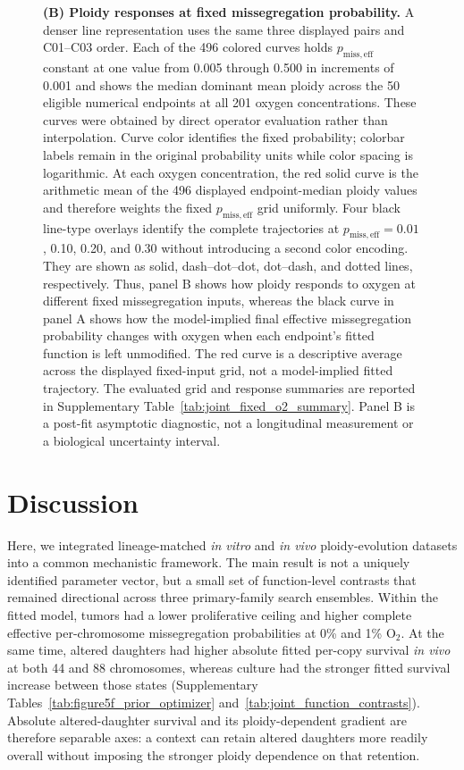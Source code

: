 \documentclass[11pt]{article}
\begin{document}
\begin{figure}[!htbp]
{\textbf{(B) Ploidy responses at fixed missegregation probability.} A denser line representation uses the same three displayed pairs and C01--C03 order. Each of the 496 colored curves holds \(p_{\mathrm{miss,eff}}\) constant at one value from 0.005 through 0.500 in increments of 0.001 and shows the median dominant mean ploidy across the 50 eligible numerical endpoints at all 201 oxygen concentrations. These curves were obtained by direct operator evaluation rather than interpolation. Curve color identifies the fixed probability; colorbar labels remain in the original probability units while color spacing is logarithmic. At each oxygen concentration, the red solid curve is the arithmetic mean of the 496 displayed endpoint-median ploidy values and therefore weights the fixed \(p_{\mathrm{miss,eff}}\) grid uniformly. Four black line-type overlays identify the complete trajectories at \(p_{\mathrm{miss,eff}}=0.01\), 0.10, 0.20, and 0.30 without introducing a second color encoding. They are shown as solid, dash--dot--dot, dot--dash, and dotted lines, respectively. Thus, panel B shows how ploidy responds to oxygen at different fixed missegregation inputs, whereas the black curve in panel A shows how the model-implied final effective missegregation probability changes with oxygen when each endpoint's fitted function is left unmodified. The red curve is a descriptive average across the displayed fixed-input grid, not a model-implied fitted trajectory. The evaluated grid and response summaries are reported in Supplementary Table~\ref{tab:joint_fixed_o2_summary}. Panel B is a post-fit asymptotic diagnostic, not a longitudinal measurement or a biological uncertainty interval.}
\label{fig:iteration1-o2-linked-model-selection}
\end{figure}


\clearpage
\section*{Discussion}

Here, we integrated lineage-matched \textit{in vitro} and \textit{in vivo} ploidy-evolution datasets into a common mechanistic framework. The main result is not a uniquely identified parameter vector, but a small set of function-level contrasts that remained directional across three primary-family search ensembles. Within the fitted model, tumors had a lower proliferative ceiling and higher complete effective per-chromosome missegregation probabilities at 0\% and 1\% O$_2$. At the same time, altered daughters had higher absolute fitted per-copy survival \textit{in vivo} at both 44 and 88 chromosomes, whereas culture had the stronger fitted survival increase between those states (Supplementary Tables~\ref{tab:figure5f_prior_optimizer} and~\ref{tab:joint_function_contrasts}). Absolute altered-daughter survival and its ploidy-dependent gradient are therefore separable axes: a context can retain altered daughters more readily overall without imposing the stronger ploidy dependence on that retention.
\end{document}
